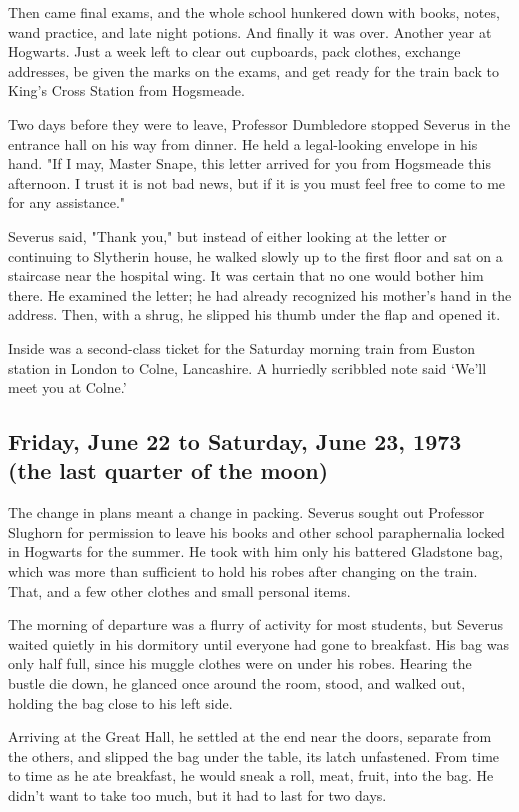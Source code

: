 Then came final exams, and the whole school hunkered down with books, notes, wand practice, and late night potions. And finally it was over. Another year at Hogwarts. Just a week left to clear out cupboards, pack clothes, exchange addresses, be given the marks on the exams, and get ready for the train back to King's Cross Station from Hogsmeade.

Two days before they were to leave, Professor Dumbledore stopped Severus in the entrance hall on his way from dinner. He held a legal-looking envelope in his hand. "If I may, Master Snape, this letter arrived for you from Hogsmeade this afternoon. I trust it is not bad news, but if it is you must feel free to come to me for any assistance."

Severus said, "Thank you," but instead of either looking at the letter or continuing to Slytherin house, he walked slowly up to the first floor and sat on a staircase near the hospital wing. It was certain that no one would bother him there. He examined the letter; he had already recognized his mother's hand in the address. Then, with a shrug, he slipped his thumb under the flap and opened it.

Inside was a second-class ticket for the Saturday morning train from Euston station in London to Colne, Lancashire. A hurriedly scribbled note said `We'll meet you at Colne.'

\subsection{Friday, June 22 to Saturday, June 23, 1973 (the last quarter of the moon)}

The change in plans meant a change in packing. Severus sought out Professor Slughorn for permission to leave his books and other school paraphernalia locked in Hogwarts for the summer. He took with him only his battered Gladstone bag, which was more than sufficient to hold his robes after changing on the train. That, and a few other clothes and small personal items.

The morning of departure was a flurry of activity for most students, but Severus waited quietly in his dormitory until everyone had gone to breakfast. His bag was only half full, since his muggle clothes were on under his robes. Hearing the bustle die down, he glanced once around the room, stood, and walked out, holding the bag close to his left side.

Arriving at the Great Hall, he settled at the end near the doors, separate from the others, and slipped the bag under the table, its latch unfastened. From time to time as he ate breakfast, he would sneak a roll, meat, fruit, into the bag. He didn't want to take too much, but it had to last for two days.


